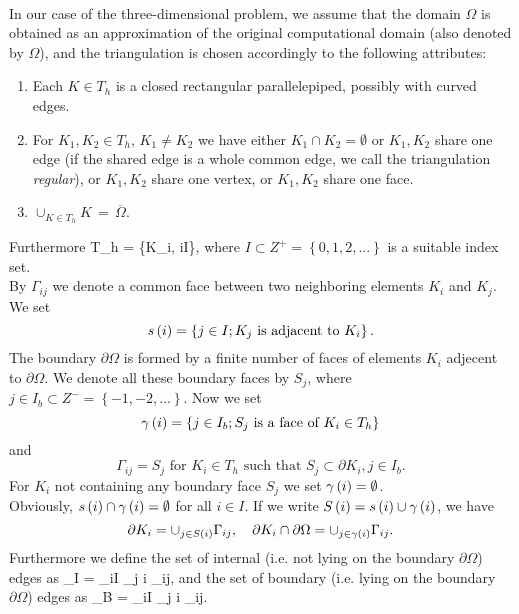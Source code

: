 \paragraph{}
In our case of the three-dimensional problem, we assume that the domain $\Omega$ is obtained as an approximation of the original computational domain (also denoted by $\Omega$), and the triangulation is chosen accordingly to the following attributes:
\renewcommand{\labelenumi}{\Alph{enumi})}
\begin{enumerate}
    \item Each $K\in T_h$ is a closed rectangular parallelepiped, possibly with curved edges.
    \item For $K_1,K_2\in T_h,\,K_1\neq{K}_2$ we have either $K_1\cap{K}_2 = \emptyset$ or $K_1,K_2$ share one edge (if the shared edge is a whole common edge, we call the triangulation \emph{regular}), or $K_1,K_2$ share one vertex, or $K_1,K_2$ share one face.
    \item$\cup_{K\in T_h}K\,=\,\overline{\Omega}.$
\end{enumerate}
Furthermore
\be
\label{Idef}  T_h = \left\{K_i, i\in I\right\},
\ee
where $I\subset Z^+ = \left\{0, 1, 2, ...\right\}$ is a suitable index set.\\
By $\Gamma_{ij}$ we denote a common face between two
neighboring elements $K_i$ and $K_j$. We set 
$$s
\left( i\right) = \left\{j\in I; K_j \text{ is adjacent to } K_i\right\}.
$$
The boundary $\partial\Omega$ is formed by a finite number of faces of elements $K_i$ adjecent to
$\partial\Omega$. We denote all these boundary faces by $S_j$, where $j\in I_b\subset Z^{-} = \left\{-1, -2, ...\right\}$.
Now we set 
$$
\gamma\left( i \right) = \left\{j\in I_b; S_j \text{ is a face of } K_i\in T_h\right\}
$$ 
and 
$$
\Gamma_{ij} = S_j\text{ for } K_i\in  T_h\text{ such that }S_j\subset\partial K_i, j\in I_b.
$$
For $K_i$ not containing any boundary face $S_j$ we set $\gamma\left( i \right) = \emptyset$.\\
Obviously, $s\left( i \right) \cap\gamma\left( i\right) = \emptyset$ for all $i\in I$. If we write $S\left( i \right) = s \left( i\right) \cup \gamma\left( i \right)$, we have
$$
\partial K_i = \cup_{j\in S\left( i \right)}\Gamma_{ij},\ \ \ \partial K_i\cap\partial{\Omega} = \cup_{j\in\gamma\left( i \right)}\Gamma_{ij}.
$$
Furthermore we define the set of internal (i.e. not lying on the boundary $\partial\Omega$) edges as
\be
\label{InternalEdges} \Gamma_I = \cup_{i\in I} \cup_{j \notin \gamma\lo i \ro} \Gamma_{ij},
\ee
and the set of boundary (i.e. lying on the boundary $\partial\Omega$) edges as
\be
\label{BndEdges} \Gamma_B = \cup_{i\in I} \cup_{j \in \gamma\lo i \ro} \Gamma_{ij}.
\ee
